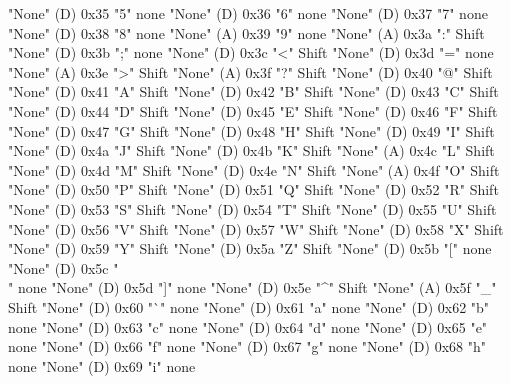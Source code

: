 "None"        (D)    0x35    "5"           none
"None"        (D)    0x36    "6"           none
"None"        (D)    0x37    "7"           none
"None"        (D)    0x38    "8"           none
"None"        (A)    0x39    "9"           none
"None"        (A)    0x3a    ":"           Shift
"None"        (D)    0x3b    ";"           none
"None"        (D)    0x3c    "<"           Shift
"None"        (D)    0x3d    "="           none
"None"        (A)    0x3e    ">"           Shift
"None"        (A)    0x3f    "?"           Shift
"None"        (D)    0x40    "@"           Shift
"None"        (D)    0x41    "A"           Shift
"None"        (D)    0x42    "B"           Shift
"None"        (D)    0x43    "C"           Shift
"None"        (D)    0x44    "D"           Shift
"None"        (D)    0x45    "E"           Shift
"None"        (D)    0x46    "F"           Shift
"None"        (D)    0x47    "G"           Shift
"None"        (D)    0x48    "H"           Shift
"None"        (D)    0x49    "I"           Shift
"None"        (D)    0x4a    "J"           Shift
"None"        (D)    0x4b    "K"           Shift
"None"        (A)    0x4c    "L"           Shift
"None"        (D)    0x4d    "M"           Shift
"None"        (D)    0x4e    "N"           Shift
"None"        (A)    0x4f    "O"           Shift
"None"        (D)    0x50    "P"           Shift
"None"        (D)    0x51    "Q"           Shift
"None"        (D)    0x52    "R"           Shift
"None"        (D)    0x53    "S"           Shift
"None"        (D)    0x54    "T"           Shift
"None"        (D)    0x55    "U"           Shift
"None"        (D)    0x56    "V"           Shift
"None"        (D)    0x57    "W"           Shift
"None"        (D)    0x58    "X"           Shift
"None"        (D)    0x59    "Y"           Shift
"None"        (D)    0x5a    "Z"           Shift
"None"        (D)    0x5b    "["           none
"None"        (D)    0x5c    "\\"          none
"None"        (D)    0x5d    "]"           none
"None"        (D)    0x5e    "^"           Shift
"None"        (A)    0x5f    "_"           Shift
"None"        (D)    0x60    "`"           none
"None"        (D)    0x61    "a"           none
"None"        (D)    0x62    "b"           none
"None"        (D)    0x63    "c"           none
"None"        (D)    0x64    "d"           none
"None"        (D)    0x65    "e"           none
"None"        (D)    0x66    "f"           none
"None"        (D)    0x67    "g"           none
"None"        (D)    0x68    "h"           none
"None"        (D)    0x69    "i"           none
